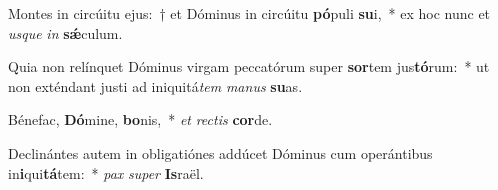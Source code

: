 \item Montes in circúitu ejus:~† et Dóminus in circúitu \textbf{pó}puli \textbf{su}i,~* ex hoc nunc et \textit{us}\textit{que} \textit{in} \textbf{sǽ}culum.
\item Quia non relínquet Dóminus virgam peccatórum super \textbf{sor}tem jus\textbf{tó}rum:~* ut non exténdant justi ad iniquitá\textit{tem} \textit{ma}\textit{nus} \textbf{su}as.
\item Bénefac, \textbf{Dó}mine, \textbf{bo}nis,~* \textit{et} \textit{rec}\textit{tis} \textbf{cor}de.
\item Declinántes autem in obligatiónes addúcet Dóminus cum operántibus in\textbf{i}qui\textbf{tá}tem:~* \textit{pax} \textit{su}\textit{per} \textbf{Is}raël.
